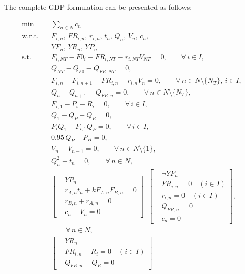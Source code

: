 \documentclass[11pt]{article}
\DeclareMathOperator*{\bigveebar}{\underline{\bigvee}}
\begin{document}
\begin{appendices}
The complete GDP formulation can be presented as follows:

\begingroup
\begin{equation}
\begin{aligned}
\min \quad
& \sum_{n\in N} c_n
\\
\text{w.r.t.} \quad
& F_{i,n},\, FR_{i,n},\, r_{i,n},\, t_n,\, Q_n,\, V_n,\, c_n,
\\
& YF_n,\, YR_n,\, YP_n
\\[0.4em]
\text{s.t.} \quad
& F_{i,NT}-F0_i-FR_{i,NT}-r_{i,NT}V_{NT}=0,
\qquad \forall\, i\in I,
\\
& Q_{NT}-Q_{F0}-Q_{FR,NT}=0,
\\
& F_{i,n}-F_{i,n+1}-FR_{i,n}-r_{i,n}V_n=0,
\qquad \forall\, n\in N\setminus\{N_T\},\ i\in I,
\\
& Q_{n}-Q_{n+1}-Q_{FR,n}=0,
\qquad \forall\, n\in N\setminus\{N_T\},
\\
& F_{i,1}-P_i-R_i=0,
\qquad \forall\, i\in I,
\\
& Q_{1}-Q_P-Q_R=0,
\\
& P_iQ_{1}-F_{i,1}Q_P=0,
\qquad \forall\, i\in I,
\\
& 0.95\,Q_P-P_B=0,
\\
& V_n-V_{n-1}=0,
\qquad \forall\, n\in N\setminus\{1\},
\\
& Q_n^{2}-t_n=0,
\qquad \forall\, n\in N,
\\[0.6em]
&
\left[
\begin{aligned}
& YP_n\\
& r_{A,n}t_n+kF_{A,n}F_{B,n}=0\\
& r_{B,n}+r_{A,n}=0\\
& c_n-V_n=0
\end{aligned}
\right]
\bigveebar
\left[
\begin{aligned}
& \neg YP_n\\
& FR_{i,n}=0 \quad (i\in I)\\
& r_{i,n}=0 \quad (i\in I)\\
& Q_{FR,n}=0\\
& c_n=0
\end{aligned}
\right],
\\
& \hspace{2em} \forall\, n\in N,
\\[0.6em]
&
\left[
\begin{aligned}
& YR_n\\
& FR_{i,n}-R_i=0 \quad (i\in I)\\
& Q_{FR,n}-Q_R=0
\end{aligned}
\right]
\bigveebar

\end{aligned}
\end{equation}
\end{appendices}
\end{document}
